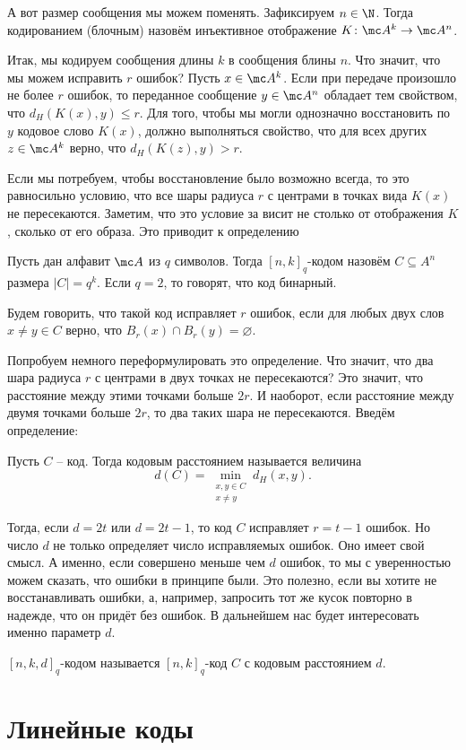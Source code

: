 А вот размер сообщения мы можем поменять. Зафиксируем $n\in \N$. Тогда кодированием (блочным) назовём инъективное  отображение $K\colon \mc A^k \to \mc A^n$.

Итак, мы кодируем сообщения длины $k$ в сообщения блины $n$. Что значит, что мы можем исправить $r$ ошибок? Пусть $x\in \mc A^k$. Если при передаче произошло не более $r$ ошибок, то переданное сообщение $y \in \mc A^n$ обладает тем свойством, что $d_H(K(x),y)\leq r$. Для того, чтобы мы могли однозначно восстановить по $y$ кодовое слово $K(x)$, должно выполняться свойство, что для всех других $z\in \mc A^k$ верно, что $d_H(K(z),y) > r$.

Если мы потребуем, чтобы восстановление было возможно всегда, то  это равносильно условию, что все шары радиуса $r$ с центрами в точках вида $K(x)$ не пересекаются. Заметим, что это условие за висит не столько от отображения $K$, сколько от его образа. Это приводит к определению

\dfn Пусть дан алфавит $\mc A$ из $q$ символов. Тогда $[n,k]_q$-кодом назовём  $C \subseteq A^n$ размера $|C|=q^k$.  Если $q=2$, то говорят, что код бинарный.
\edfn

\dfn Будем говорить, что такой код исправляет $r$ ошибок, если для любых двух слов $x\neq y \in C$ верно, что $B_r(x) \cap B_r(y)= \varnothing$. 
\edfn

Попробуем немного переформулировать это определение. Что значит, что два шара радиуса $r$ с центрами в двух точках не пересекаются? Это значит, что расстояние между этими точками больше $2r$. И наоборот, если расстояние между двумя точками больше $2r$, то два таких шара не пересекаются. Введём определение:

\dfn Пусть $C$ -- код. Тогда кодовым расстоянием называется величина
$$d(C)= \min_{\substack{x,y\in C \\ x \neq y}} d_H(x,y).$$
\edfn

Тогда, если $d=2t$ или $d=2t-1$, то код $C$ исправляет  $r=t-1$ ошибок. Но число $d$ не только определяет число исправляемых ошибок. Оно имеет свой смысл. А именно, если совершено меньше чем $d$ ошибок, то мы с уверенностью можем сказать, что ошибки в принципе были. Это полезно, если вы хотите не восстанавливать ошибки, а, например, запросить тот же кусок повторно в надежде, что он придёт без ошибок. В дальнейшем нас будет интересовать именно параметр $d$.

\dfn $[n,k,d]_q$-кодом называется $[n,k]_q$-код $C$ с кодовым расстоянием $d$.
\edfn

\section{Линейные коды}

